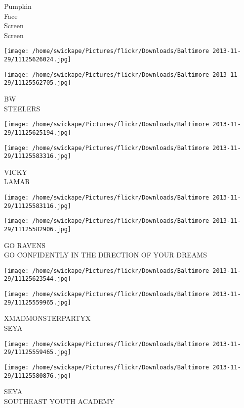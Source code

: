 \documentclass[10pt,letterpaper]{article}
\begin{document}
Pumpkin\\
Face\\
Screen\\
Screen
\pagebreak

\texttt{[image: /home/swickape/Pictures/flickr/Downloads/Baltimore 2013-11-29/11125626024.jpg]}

\vspace{0.25in}
\texttt{[image: /home/swickape/Pictures/flickr/Downloads/Baltimore 2013-11-29/11125562705.jpg]}

BW\\
STEELERS
\pagebreak

\texttt{[image: /home/swickape/Pictures/flickr/Downloads/Baltimore 2013-11-29/11125625194.jpg]}

\vspace{0.25in}
\texttt{[image: /home/swickape/Pictures/flickr/Downloads/Baltimore 2013-11-29/11125583316.jpg]}

VICKY\\
LAMAR
\pagebreak

\texttt{[image: /home/swickape/Pictures/flickr/Downloads/Baltimore 2013-11-29/11125583116.jpg]}

\vspace{0.25in}
\texttt{[image: /home/swickape/Pictures/flickr/Downloads/Baltimore 2013-11-29/11125582906.jpg]}

GO RAVENS\\
GO CONFIDENTLY IN THE DIRECTION OF YOUR DREAMS
\pagebreak

\texttt{[image: /home/swickape/Pictures/flickr/Downloads/Baltimore 2013-11-29/11125623544.jpg]}

\vspace{0.25in}
\texttt{[image: /home/swickape/Pictures/flickr/Downloads/Baltimore 2013-11-29/11125559965.jpg]}

XMADMONSTERPARTYX\\
SEYA
\pagebreak

\texttt{[image: /home/swickape/Pictures/flickr/Downloads/Baltimore 2013-11-29/11125559465.jpg]}

\vspace{0.25in}
\texttt{[image: /home/swickape/Pictures/flickr/Downloads/Baltimore 2013-11-29/11125580876.jpg]}

SEYA\\
SOUTHEAST YOUTH ACADEMY
\pagebreak
\end{document}
